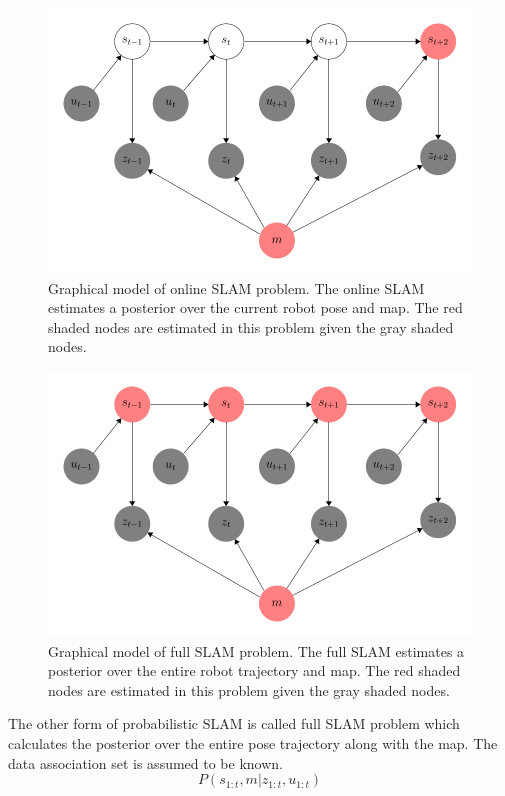 \begin{figure}
\centering
\includegraphics[scale=0.9]{./images/fsm2}
\caption[Dynamic Bayesian Network graph of online SLAM problem]{Graphical model of online SLAM problem. The online SLAM estimates a posterior over the current robot pose and map. The red shaded nodes are estimated in this problem given the gray shaded nodes.}
\label{online_SLAM}
\end{figure}

\begin{figure}
\centering
\includegraphics[scale=0.9]{./images/fsm3}
\caption[Dynamic Bayesian Network graph of full SLAM problem]{Graphical model of full SLAM problem. The full SLAM estimates a posterior over the entire robot trajectory and map. The red shaded nodes are estimated in this problem given the gray shaded nodes.}
\label{full_SLAM}
\end{figure}

The other form of probabilistic SLAM is called full SLAM problem which calculates the posterior over the entire pose trajectory along with the map. The data association set is assumed to be known.
\begin{equation}
P(s_{1:t},m|z_{1:t},u_{1:t})
\end{equation}


